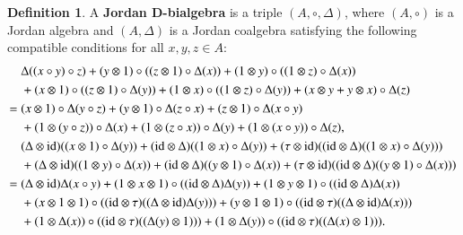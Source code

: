 \documentclass[12pt, reqno, a4paper]{amsart}
\theoremstyle{definition}
\newtheorem{definition}[theorem]{Definition}
\newcommand{\id}{\mathrm{id}}
\begin{document}
\begin{definition}
	A {\bf Jordan D-bialgebra} is a triple $(A, \circ, \Delta)$, where $(A, \circ)$ is a Jordan algebra and $(A,\Delta)$ is a Jordan coalgebra satisfying the following compatible conditions for all $x, y, z \in A$:
	\begin{align}
		& \Delta((x \circ y) \circ z) + (y \otimes 1) \circ ((z \otimes 1) \circ \Delta(x))
		+ (1 \otimes y) \circ ((1 \otimes z) \circ \Delta(x)) \notag                                                                                                                                         \\
		    & + (x \otimes 1) \circ ((z \otimes 1) \circ \Delta(y)) + (1 \otimes x) \circ ((1 \otimes z) \circ \Delta(y)) + (x \otimes y + y \otimes x) \circ \Delta(z) \notag                               \\
		=\; & (x \otimes 1) \circ \Delta(y \circ z) + (y \otimes 1) \circ \Delta(z \circ x) + (z \otimes 1) \circ \Delta(x \circ y) \notag                                                                   \\
		    & + (1 \otimes (y \circ z)) \circ \Delta(x) + (1 \otimes (z \circ x)) \circ \Delta(y) + (1 \otimes (x \circ y)) \circ \Delta(z), \label{eq:jdb1}                                                 \\
		    & (\Delta \otimes \id)((x \otimes 1) \circ \Delta(y)) + (\id \otimes \Delta)((1 \otimes x) \circ \Delta(y)) + (\tau \otimes \id)((\id \otimes \Delta)((1 \otimes x) \circ \Delta(y))) \notag   \\
		    & + (\Delta \otimes \id)((1 \otimes y) \circ \Delta(x))
		+ (\id \otimes \Delta)((y \otimes 1) \circ \Delta(x)) + (\tau \otimes \id)((\text{id} \otimes \Delta)((y \otimes 1) \circ \Delta(x))) \notag                                                       \\
		=\; & (\Delta \otimes \text{id})\Delta(x \circ y) + (1 \otimes x \otimes 1) \circ ((\text{id} \otimes \Delta)\Delta(y)) + (1 \otimes y \otimes 1) \circ ((\text{id} \otimes \Delta)\Delta(x)) \notag \\
		    & + (x \otimes 1 \otimes 1) \circ ((\text{id} \otimes \tau)((\Delta \otimes \text{id})\Delta(y)))
		+ (y \otimes 1 \otimes 1) \circ ((\text{id} \otimes \tau)((\Delta \otimes \text{id})\Delta(x))) \notag                                                                                             \\
		    & + (1 \otimes \Delta(x)) \circ ((\text{id} \otimes \tau)((\Delta(y) \otimes 1))) + (1 \otimes \Delta(y)) \circ ((\text{id} \otimes \tau)((\Delta(x) \otimes 1))). \label{eq:jdb2}
	\end{align}
\end{definition}
\end{document}
